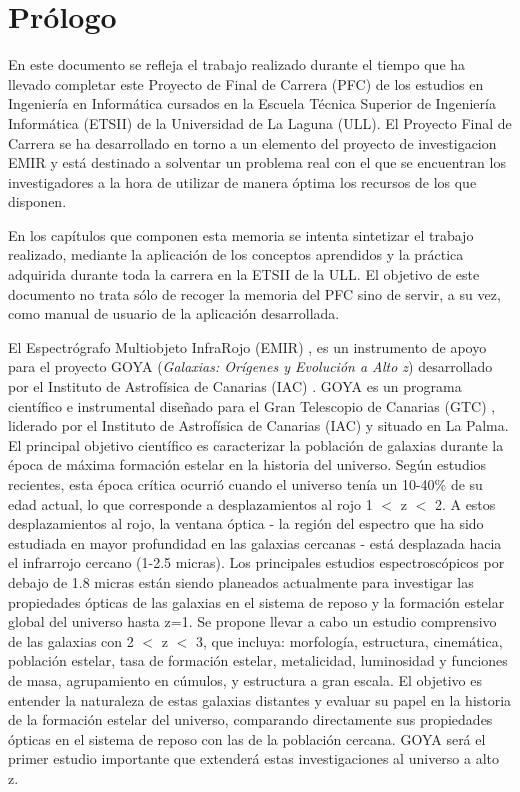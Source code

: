 %
%
%
%
\chapter*{Prólogo} \label{chap:estado}
En este documento se refleja el trabajo realizado durante el tiempo que ha
llevado completar este Proyecto de Final de Carrera (PFC) de los estudios en
Ingeniería en Informática cursados en la Escuela Técnica Superior de Ingeniería
Informática (ETSII) de la Universidad de La Laguna (ULL). El Proyecto Final
de Carrera se ha desarrollado en torno a un elemento del proyecto de investigacion
EMIR y está destinado a solventar un problema real con el que se encuentran los
investigadores a la hora de utilizar de manera óptima los recursos de los que
disponen.

En los capítulos que componen esta memoria se intenta sintetizar el trabajo
realizado, mediante la aplicación de los conceptos aprendidos y la práctica
adquirida durante toda la carrera en la ETSII de la ULL. El objetivo de este
documento no trata sólo de recoger la memoria del PFC sino de
servir, a su vez, como manual de usuario de la aplicación desarrollada.

El Espectrógrafo Multiobjeto InfraRojo (EMIR) \cite{Web:EMIR}, es un instrumento
de apoyo para el proyecto GOYA \cite{Web:GOYA} (\textit{Galaxias: Orígenes y Evolución a Alto z}) desarrollado por el Instituto
de Astrofísica de Canarias (IAC) \cite{Web:IAC}. GOYA es un programa
científico e instrumental diseñado para el Gran Telescopio de Canarias (GTC)
\cite{Web:GTC}, liderado por el Instituto de Astrofísica de Canarias (IAC) y
situado en La Palma. El principal objetivo científico es caracterizar la
población de galaxias durante la época de máxima formación estelar en la
historia del universo. Según estudios recientes, esta época crítica ocurrió
cuando el universo tenía un 10-40\% de su edad actual, lo que corresponde a
desplazamientos al rojo 1 $<$ z $<$ 2. A estos desplazamientos al rojo, la
ventana óptica - la región del espectro que ha sido estudiada en mayor
profundidad en las galaxias cercanas - está desplazada hacia el infrarrojo
cercano (1-2.5 micras). Los principales estudios espectroscópicos por debajo de
1.8 micras están siendo planeados actualmente para investigar las propiedades
ópticas de las galaxias en el sistema de reposo y la formación estelar global
del universo hasta z=1. Se propone llevar a cabo un estudio comprensivo de las
galaxias con 2 $<$ z $<$ 3, que incluya: morfología, estructura, cinemática,
población estelar, tasa de formación estelar, metalicidad, luminosidad y
funciones de masa, agrupamiento en cúmulos, y estructura a gran escala. El
objetivo es entender la naturaleza de estas galaxias distantes y evaluar su
papel en la historia de la formación estelar del universo, comparando
directamente sus propiedades ópticas en el sistema de reposo con las de la
población cercana. GOYA será el primer estudio importante que extenderá estas
investigaciones al universo a alto z.

